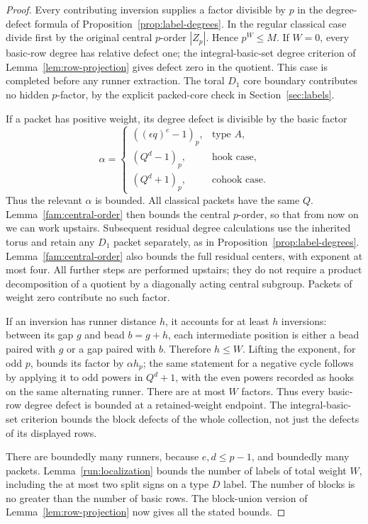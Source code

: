 \begin{proof}
Every contributing inversion supplies a factor divisible by \(p\)
in the degree-defect formula of
Proposition~\ref{prop:label-degrees}.  In the regular classical
case divide first by the original central \(p\)-order \(|Z_p|\).  Hence
\(p^W\leq M\).
If \(W=0\), every basic-row degree has relative defect one;
the integral-basic-set degree criterion of
Lemma~\ref{lem:row-projection} gives defect zero in the quotient.
This case is completed before any runner extraction.  The toral
\(D_1\) core boundary contributes no hidden \(p\)-factor, by
the explicit packed-core check in Section~\ref{sec:labels}.

If a packet has positive weight, its degree defect is divisible by
the basic factor
\[
 \alpha=
 \begin{cases}
 ((\epsilon q)^e-1)_p,&\text{type }A,\\
 (Q^d-1)_p,&\text{hook case},\\
 (Q^d+1)_p,&\text{cohook case}.
 \end{cases}
\]
Thus the relevant \(\alpha\) is bounded.  All classical packets
have the same \(Q\).  Lemma~\ref{fam:central-order} then bounds
the central \(p\)-order, so that from now on we can work upstairs.
Subsequent residual degree calculations use the inherited torus
and retain any \(D_1\) packet separately, as in
Proposition~\ref{prop:label-degrees}.
Lemma~\ref{fam:central-order} also bounds the full residual
centers, with exponent at most four.  All further steps are
performed upstairs; they do not require a product decomposition
of a quotient by a diagonally acting central subgroup.
Packets of weight zero contribute no such factor.

If an inversion has runner distance \(h\), it accounts for at
least \(h\) inversions: between its gap \(g\) and bead \(b=g+h\),
each intermediate position is either a bead paired with \(g\)
or a gap paired with \(b\).  Therefore \(h\leq W\).
Lifting the exponent, for odd \(p\), bounds its factor by
\(\alpha h_p\); the same statement for a negative cycle follows
by applying it to odd powers in \(Q^d+1\), with the even powers
recorded as hooks on the same alternating runner.
There are at most \(W\) factors.  Thus every basic-row degree
defect is bounded at a retained-weight endpoint.
The integral-basic-set criterion bounds the block defects of the
whole collection, not just the defects of its displayed rows.

There are boundedly many runners, because \(e,d\leq p-1\), and
boundedly many packets.  Lemma~\ref{run:localization} bounds the
number of labels of total weight \(W\), including the at most two
split signs on a type \(D\) label.  The number of blocks is no
greater than the number of basic rows.  The block-union version
of Lemma~\ref{lem:row-projection} now gives all the stated bounds.
\end{proof}

